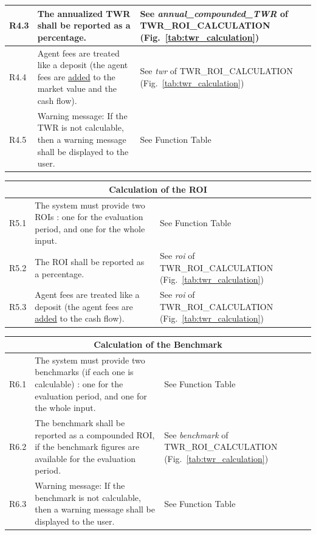 \documentclass[runningheads,12pt]{article}
\begin{document}
{\begin{longtable}{|l|p{9cm}|p{5cm}|}
\hline
R4.3 & The annualized TWR shall be reported as a percentage. & See \textit{annual\_compounded\_TWR} of TWR\_ROI\_CALCULATION (Fig.~\ref{tab:twr_calculation})\\

\hline
R4.4 & Agent fees are treated like a deposit (the agent fees are \underline{added} to the market value and the cash flow). & See \textit{twr} of TWR\_ROI\_CALCULATION (Fig.~\ref{tab:twr_calculation})\\

\hline
R4.5 & Warning message: If the TWR is not calculable, then a warning message shall be displayed to the user. & See Function Table\\

\hline
\end{longtable}
\centering
\begin{longtable}{|l|p{9cm}|p{5cm}|}

\hline
\multicolumn{3}{|c|}{\textbf{Calculation of the ROI}} \\

\hline
R5.1 & The system must provide two ROIs : one for the evaluation period, and one for the whole input. & See Function Table\\

\hline
R5.2 & The ROI shall be reported as a percentage. & See \textit{roi} of TWR\_ROI\_CALCULATION (Fig.~\ref{tab:twr_calculation})\\

\hline
R5.3 & Agent fees are treated like a deposit (the agent fees are \underline{added} to the cash flow). & See \textit{roi} of TWR\_ROI\_CALCULATION (Fig.~\ref{tab:twr_calculation})\\

\hline
\end{longtable}
\centering
\begin{longtable}{|l|p{9cm}|p{5cm}|}

\hline
\multicolumn{3}{|c|}{\textbf{Calculation of the Benchmark}} \\

\hline
R6.1 & The system must provide two benchmarks (if each one is calculable) : one for the evaluation period, and one for the whole input. & See Function Table\\

\hline
R6.2 & The benchmark shall be reported as a compounded ROI, if the benchmark figures are available for the evaluation period. & See \textit{benchmark} of TWR\_ROI\_CALCULATION (Fig.~\ref{tab:twr_calculation})\\

\hline
R6.3 & Warning message: If the benchmark is not calculable, then a warning message shall be displayed to the user. & See Function Table\\



\hline
\end{longtable}
}
\end{document}
